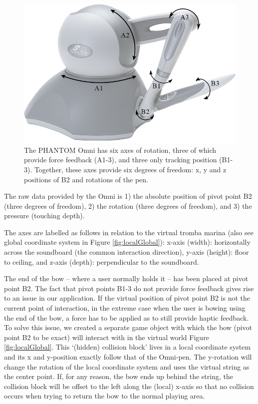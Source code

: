\documentclass[dvipsnames, pdftex]{article}
\begin{document}
\begin{figure}[t]\includegraphics[width=1.0\columnwidth]{figures/omniSchematic.png}
\centering
  \caption{The PHANTOM Omni has six axes of rotation, three of which provide force feedback (A1-3), and three only tracking position (B1-3). Together, these axes provide six degrees of freedom: x, y and z positions of B2 and rotations of the pen. \label{fig:omni}}
\end{figure}

The raw data provided by the Omni is 1) the absolute position of pivot point B2 (three degrees of freedom), 2) the rotation (three degrees of freedom), and 3) the pressure (touching depth).

The axes are labelled as follows in relation to the virtual tromba marina (also see global coordinate system in Figure \ref{fig:localGlobal}): x-axis (width): horizontally across the soundboard (the common interaction direction), y-axis (height): floor to ceiling, and z-axis (depth): perpendicular to the soundboard.

The end of the bow -- where a user normally holds it -- has been placed at pivot point B2. The fact that pivot points B1-3 do not provide force feedback gives rise to an issue in our application. If the virtual
position of pivot point B2 is not the current point of interaction, in the extreme case when the user is bowing using the end of the bow, a force has to be applied as to still provide haptic feedback. To solve this issue, we created a separate game object with which the bow (pivot point B2 to be exact) will interact with in the virtual world Figure \ref{fig:localGlobal}. This `(hidden) collision block' lives in a local coordinate system and its x and y-position exactly follow that of the Omni-pen. The y-rotation will change the rotation of the local coordinate system and uses the virtual string as the center point. If, for any reason, the bow ends up behind the string, the collision block will be offset to the left along the (local) x-axis so that no collision occurs when trying to return the bow to the normal playing area. 
\end{document}

